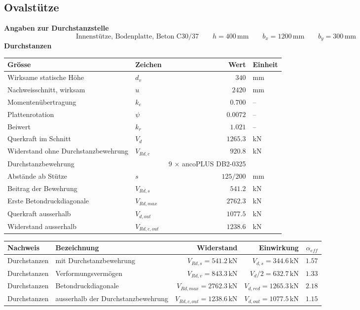 \documentclass[11pt,a4paper]{article}
\begin{document}
\subsection{Ovalstütze}
\noindent\textbf{Angaben zur Durchstanzstelle}
\begin{equation*}
\text{Innenstütze, Bodenplatte, Beton C30/37} \qquad h = 400\,\mathrm{mm} \qquad b_x = 1200\,\mathrm{mm} \qquad b_y = 300\,\mathrm{mm}
\end{equation*}
\noindent\textbf{Durchstanzen}
\begin{longtable}{llrl}
\hline
Grösse & Zeichen & Wert & Einheit \\
\hline
\endhead
Wirksame statische Höhe & $d_v$ & $340$ & mm \\
Nachweisschnitt, wirksam & $u$ & $2420$ & mm \\
Momentenübertragung & $k_e$ & $0.700$ & – \\
Plattenrotation & $\psi$ & $0.0072$ & – \\
Beiwert & $k_r$ & $1.021$ & – \\
Querkraft im Schnitt & $V_d$ & $1265.3$ & kN \\
Widerstand ohne Durchstanzbewehrung & $V_{Rd,c}$ & $920.8$ & kN \\
Durchstanzbewehrung &  & 9 × ancoPLUS DB2-0325 &  \\
Abstände ab Stütze & $s$ & $125 / 200$ & mm \\
Beitrag der Bewehrung & $V_{Rd,s}$ & $541.2$ & kN \\
Erste Betondruckdiagonale & $V_{Rd,max}$ & $2762.3$ & kN \\
Querkraft ausserhalb & $V_{d,out}$ & $1077.5$ & kN \\
Widerstand ausserhalb & $V_{Rd,c,out}$ & $1238.6$ & kN \\
\hline
\end{longtable}
\begin{xltabular}{\linewidth}{>{\raggedright\arraybackslash}X>{\raggedright\arraybackslash}Xrrr}
\hline
Nachweis & Bezeichnung & Widerstand & Einwirkung & $\alpha_{eff}$ \\
\hline
\endhead
Durchstanzen & mit Durchstanzbewehrung & $V_{Rd,s} = 541.2\,\mathrm{kN}$ & $V_{d,s} = 344.6\,\mathrm{kN}$ & $1.57$ \\
Durchstanzen & Verformungsvermögen & $V_{Rd,v} = 843.3\,\mathrm{kN}$ & $V_d / 2 = 632.7\,\mathrm{kN}$ & $1.33$ \\
Durchstanzen & Betondruckdiagonale & $V_{Rd,max} = 2762.3\,\mathrm{kN}$ & $V_{d,red} = 1265.3\,\mathrm{kN}$ & $2.18$ \\
Durchstanzen & ausserhalb der Durchstanzbewehrung & $V_{Rd,c,out} = 1238.6\,\mathrm{kN}$ & $V_{d,out} = 1077.5\,\mathrm{kN}$ & $1.15$ \\
\hline
\end{xltabular}
\end{document}
